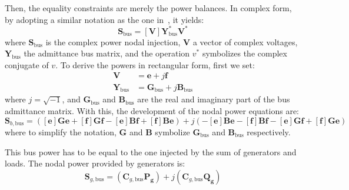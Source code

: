 \documentclass{article}
\begin{document}
Then, the equality constraints are merely the power balances. In complex form, by adopting a similar notation as the one in~\cite{zimmerman2016matpower}, it yields: 
\begin{equation}
    \bm{S}_\text{bus} = [\bm{V}]\bm{Y}^*_\text{bus}\bm{V}^*
    \label{eq:sbus}
\end{equation}
where $\bm{S}_\text{bus}$ is the complex power nodal injection, $\bm{V}$ a vector of complex voltages, $\bm{Y}_\text{bus}$ the admittance bus matrix, and the operation $v^*$ symbolizes the complex conjugate of $v$. To derive the powers in rectangular form, first we set:
\begin{align}
    \bm{V} &= \bm{e} + j\bm{f} \\
    \bm{Y}_\text{bus} &= \bm{G}_\text{bus} + j\bm{B}_\text{bus}
\end{align}
where $j=\sqrt{-1}$, and $\bm{G}_\text{bus}$ and $\bm{B}_\text{bus}$ are the real and imaginary part of the bus admittance matrix. With this, the development of the nodal power equations are:
\begin{equation}
    \bm{S}_{b,\text{bus}} = ([\bm{e}]\bm{G}\bm{e} + [\bm{f}]\bm{G}\bm{f} - [\bm{e}]\bm{B}\bm{f} + [\bm{f}]\bm{B}\bm{e}) + j(-[\bm{e}]\bm{B}\bm{e} - [\bm{f}]\bm{B}\bm{f} - [\bm{e}]\bm{G}\bm{f} + [\bm{f}]\bm{G}\bm{e})
\end{equation}
where to simplify the notation, $\bm{G}$ and $\bm{B}$ symbolize $\bm{G}_\text{bus}$ and $\bm{B}_\text{bus}$ respectively.

This bus power has to be equal to the one injected by the sum of generators and loads. The nodal power provided by generators is:
\begin{equation}
    \bm{S}_{g,\text{bus}} = (\bm{C}_{g,\text{bus}} \bm{P_g}) + j(\bm{C}_{g,\text{bus}} \bm{Q_g})
\end{equation}
\end{document}
